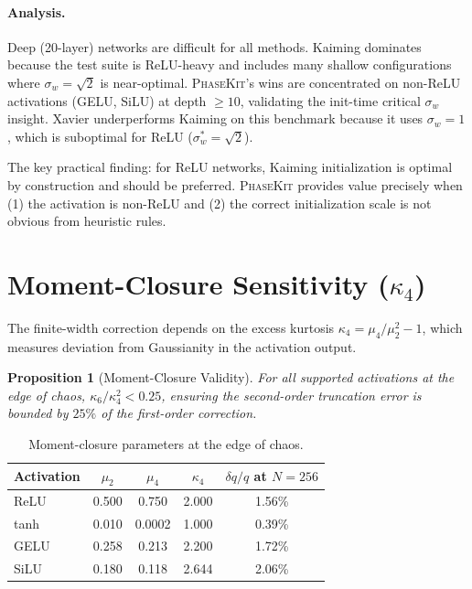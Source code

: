\documentclass[10pt]{article}
\newcommand{\ToolName}{\textsc{PhaseKit}}
\newtheorem{proposition}[theorem]{Proposition}
\begin{document}
\paragraph{Analysis.}
Deep (20-layer) networks are difficult for all methods.
Kaiming dominates because the test suite is ReLU-heavy and includes many shallow configurations where $\sigma_w = \sqrt{2}$ is near-optimal.
\ToolName{}'s wins are concentrated on non-ReLU activations (GELU, SiLU) at depth $\geq 10$, validating the init-time critical $\sigma_w$ insight.
Xavier underperforms Kaiming on this benchmark because it uses $\sigma_w = 1$, which is suboptimal for ReLU ($\sigma_w^* = \sqrt{2}$).

The key practical finding: for ReLU networks, Kaiming initialization is optimal by construction and should be preferred.
\ToolName{} provides value precisely when (1) the activation is non-ReLU and (2) the correct initialization scale is not obvious from heuristic rules.
\section{Moment-Closure Sensitivity ($\kappa_4$)}
\label{app:kappa4}

The finite-width correction depends on the excess kurtosis $\kappa_4 = \mu_4/\mu_2^2 - 1$,
which measures deviation from Gaussianity in the activation output.

\begin{proposition}[Moment-Closure Validity]
\label{prop:kappa4-validity}
For all supported activations at the edge of chaos, $\kappa_6/\kappa_4^2 < 0.25$, ensuring the second-order truncation error is bounded by $25\%$ of the first-order correction.
\end{proposition}

\begin{table}[h]
\centering
\caption{Moment-closure parameters at the edge of chaos.}
\label{tab:kappa4}
\small
\begin{tabular}{@{}lcccc@{}}
\toprule
\textbf{Activation} & $\mu_2$ & $\mu_4$ & $\kappa_4$ & $\delta q/q$ at $N\!=\!256$ \\
\midrule
ReLU  & 0.500 & 0.750 & 2.000 & 1.56\% \\
tanh  & 0.010 & 0.0002 & 1.000 & 0.39\% \\
GELU  & 0.258 & 0.213 & 2.200 & 1.72\% \\
SiLU  & 0.180 & 0.118 & 2.644 & 2.06\% \\
\bottomrule
\end{tabular}
\end{table}
\end{document}
